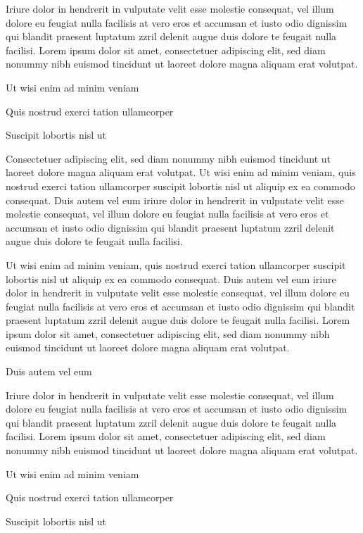 \documentclass[11pt,twoside]{article}\makeatletter
\begin{document}
Iriure dolor in hendrerit in vulputate velit esse molestie consequat, vel illum dolore eu feugiat nulla facilisis at vero eros et accumsan et iusto odio dignissim qui blandit praesent luptatum zzril delenit augue duis dolore te feugait nulla facilisi. Lorem ipsum dolor sit amet, consectetuer adipiscing elit, sed diam nonummy nibh euismod tincidunt ut laoreet dolore magna aliquam erat volutpat. \par
Ut wisi enim ad minim veniam\par
Quis nostrud exerci tation ullamcorper \par
Suscipit lobortis nisl ut \par
Consectetuer adipiscing elit, sed diam nonummy nibh euismod tincidunt ut laoreet dolore magna aliquam erat volutpat. Ut wisi enim ad minim veniam, quis nostrud exerci tation ullamcorper suscipit lobortis nisl ut aliquip ex ea commodo consequat. Duis autem vel eum iriure dolor in hendrerit in vulputate velit esse molestie consequat, vel illum dolore eu feugiat nulla facilisis at vero eros et accumsan et iusto odio dignissim qui blandit praesent luptatum zzril delenit augue duis dolore te feugait nulla facilisi.\par
Ut wisi enim ad minim veniam, quis nostrud exerci tation ullamcorper suscipit lobortis nisl ut aliquip ex ea commodo consequat. Duis autem vel eum iriure dolor in hendrerit in vulputate velit esse molestie consequat, vel illum dolore eu feugiat nulla facilisis at vero eros et accumsan et iusto odio dignissim qui blandit praesent luptatum zzril delenit augue duis dolore te feugait nulla facilisi. Lorem ipsum dolor sit amet, consectetuer adipiscing elit, sed diam nonummy nibh euismod tincidunt ut laoreet dolore magna aliquam erat volutpat. \par
Duis autem vel eum \par
Iriure dolor in hendrerit in vulputate velit esse molestie consequat, vel illum dolore eu feugiat nulla facilisis at vero eros et accumsan et iusto odio dignissim qui blandit praesent luptatum zzril delenit augue duis dolore te feugait nulla facilisi. Lorem ipsum dolor sit amet, consectetuer adipiscing elit, sed diam nonummy nibh euismod tincidunt ut laoreet dolore magna aliquam erat volutpat. \par
Ut wisi enim ad minim veniam\par
Quis nostrud exerci tation ullamcorper \par
Suscipit lobortis nisl ut 
\end{document}
